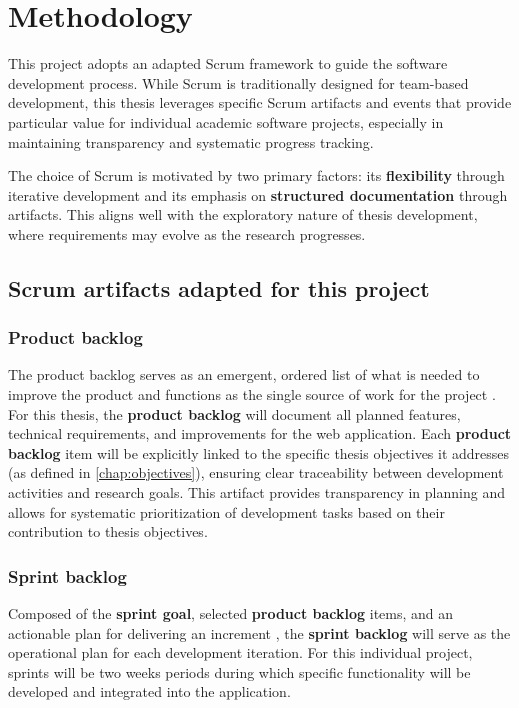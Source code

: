 \section{Methodology}

This project adopts an adapted Scrum framework to guide the software development process. While Scrum is traditionally designed for team-based development, this thesis leverages specific Scrum artifacts and events that provide particular value for individual academic software projects, especially in maintaining transparency and systematic progress tracking.

The choice of Scrum is motivated by two primary factors: its \textbf{flexibility} through iterative development and its emphasis on \textbf{structured documentation} through artifacts. This aligns well with the exploratory nature of thesis development, where requirements may evolve as the research progresses.

\subsection{Scrum artifacts adapted for this project}

\subsubsection{Product backlog}

The product backlog serves as an emergent, ordered list of what is needed to improve the product and functions as the single source of work for the project \parencite{schwaber2020scrum}. For this thesis, the \textbf{product backlog} will document all planned features, technical requirements, and improvements for the web application. Each  \textbf{product backlog} item will be explicitly linked to the specific thesis objectives it addresses (as defined in \cref{chap:objectives}), ensuring clear traceability between development activities and research goals. This artifact provides transparency in planning and allows for systematic prioritization of development tasks based on their contribution to thesis objectives.

\subsubsection{Sprint backlog}

Composed of the \textbf{sprint goal}, selected \textbf{product backlog} items, and an actionable plan for delivering an increment \parencite{schwaber2020scrum}, the \textbf{sprint backlog}  will serve as the operational plan for each development iteration. For this individual project, sprints will be two weeks periods during which specific functionality will be developed and integrated into the application.

